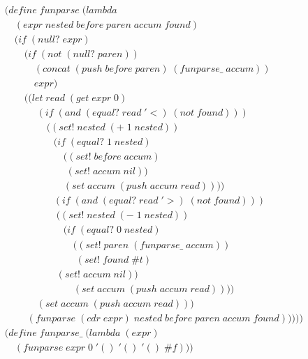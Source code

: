 \begin{figure}[htp]
\footnotesize
\caption{}\label{fig:funParse}
\begin{align*}
& (define \; funparse \; (lambda \; 
\\& \quad (expr \; nested \; before \; paren \; accum \; found) \; 
\\& \quad (if \; (null? \; expr)
\\& \qquad (if \; (not \; (null? \; paren))
\\& \qquad \quad (concat \; (push \; before \; paren) \; (funparse\_ \; accum))
\\& \qquad \quad expr)
\\& \qquad ((let \; read \; (get \; expr \; 0)
\\& \qquad \quad \; (if \; (and \; (equal? \; read \; '<) \; (not \; found)))
\\& \qquad \qquad \; ((set! \; nested \; (+ \; 1 \; nested))
\\& \qquad \qquad \quad (if \; (equal? \; 1 \; nested)
\\& \qquad \qquad \qquad ((set! \; before \; accum)
\\& \qquad \qquad \qquad \; (set! \; accum \; nil))
\\& \qquad \qquad \qquad (set \; accum \; (push \; accum \; read))))
\\& \qquad \qquad \quad (if \; (and \; (equal? \; read \; '>) \; (not \; found)))
\\& \qquad \qquad \quad \; ((set! \; nested \; (- \; 1 \; nested))
\\& \qquad \qquad \qquad (if \; (equal? \; 0 \; nested)
\\& \qquad \qquad \qquad \quad ((set! \; paren \; (funparse\_ \; accum))
\\& \qquad \qquad \qquad \quad \; (set! \; found \; \#t)
\\& \qquad \qquad \quad \; (set! \; accum \; nil))
\\& \qquad \qquad \qquad \quad (set \; accum \; (push \; accum \; read))))
\\& \qquad \quad \; (set \; accum \; (push \; accum \; read)))
\\& \qquad \; (funparse \; (cdr \; expr) \; nested \; before \; paren \; accum \; found)))))
\\& (define \; funparse\_ \; (lambda \; (expr)
\\& \quad (funparse \; expr \; 0 \; '() \; '() \; '() \; \#f))) \; 
\end{align*}
\end{figure}

